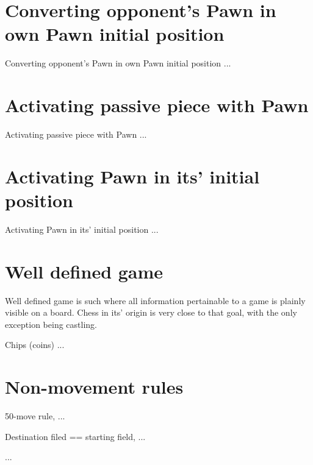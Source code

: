 \section*{Converting opponent's Pawn in own Pawn initial position}

Converting opponent's Pawn in own Pawn initial position ...

\section*{Activating passive piece with Pawn}

Activating passive piece with Pawn ...


\section*{Activating Pawn in its' initial position}

Activating Pawn in its' initial position ...

\section*{Well defined game}

Well defined game is such where all information pertainable to a game
is plainly visible on a board. Chess in its' origin is very close to
that goal, with the only exception being castling.

Chips (coins) ...

\section*{Non-movement rules}

50-move rule, ...

Destination filed == starting field, ...

...

\clearpage %
